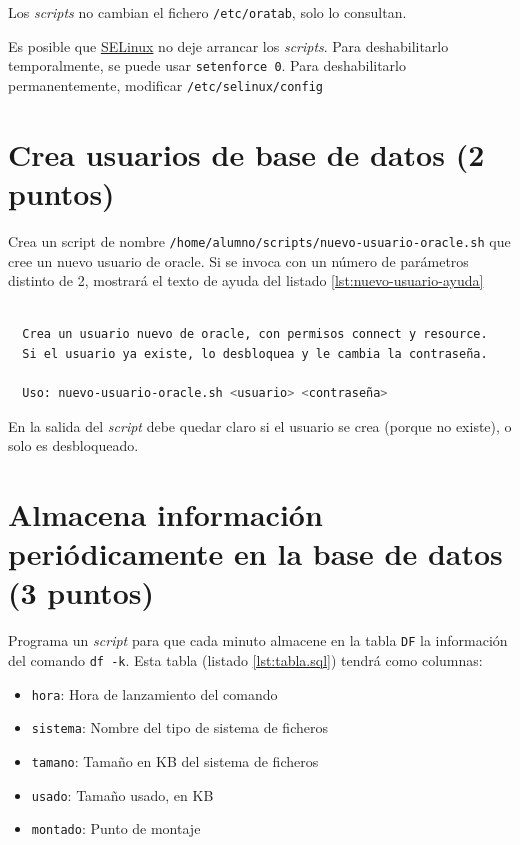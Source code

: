\documentclass[a4paper]{article}
\begin{document}
\begin{Aviso}
Los \emph{scripts} no cambian el fichero \texttt{/etc/oratab}, solo lo consultan.
\end{Aviso}

\begin{Aviso}
Es posible que \href{https://es.wikipedia.org/wiki/SELinux}{SELinux} no deje arrancar los \emph{scripts}. Para deshabilitarlo temporalmente, se puede usar \texttt{setenforce 0}. Para deshabilitarlo permanentemente, modificar \texttt{/etc/selinux/config}
\end{Aviso}

\section{Crea usuarios de base de datos (2 puntos)}
\label{sec:org0000006}
Crea un script de nombre \texttt{/home/alumno/scripts/nuevo-usuario-oracle.sh} que cree un nuevo usuario de oracle. Si se invoca con un número de parámetros distinto de 2, mostrará el texto de ayuda del listado \ref{lst:nuevo-usuario-ayuda}

\begin{lstlisting}[language=bash,label=lst:nuevo-usuario-ayuda,caption={Ayuda del script \texttt{nuevo-usuario-oracle.sh}},captionpos=b,numbers=none]

  Crea un usuario nuevo de oracle, con permisos connect y resource.
  Si el usuario ya existe, lo desbloquea y le cambia la contraseña.
  
  Uso: nuevo-usuario-oracle.sh <usuario> <contraseña>
\end{lstlisting}


\begin{Aviso}
En la salida del \emph{script} debe quedar claro si el usuario se crea (porque no existe), o solo es desbloqueado.
\end{Aviso}







\section{Almacena información periódicamente en la base de datos (3 puntos)}
\label{sec:org0000009}
Programa un \emph{script} para que cada minuto almacene en la tabla \texttt{DF} la información del comando \texttt{df -k}. Esta tabla (listado \ref{lst:tabla.sql}) tendrá como columnas:

\begin{itemize}
\item \texttt{hora}: Hora de lanzamiento del comando
\item \texttt{sistema}: Nombre del tipo de sistema de ficheros
\item \texttt{tamano}: Tamaño en KB del sistema de ficheros
\item \texttt{usado}: Tamaño usado, en KB
\item \texttt{montado}: Punto de montaje
\end{itemize}
\end{document}
